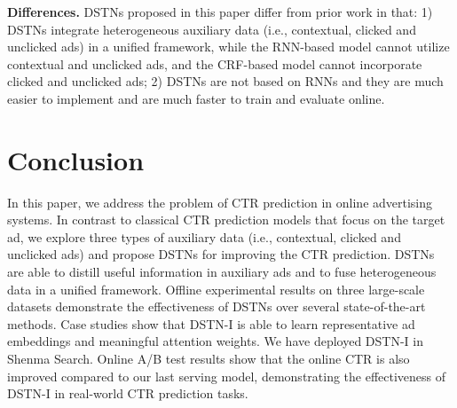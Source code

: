 \documentclass[sigconf]{acmart}
\begin{document}
\textbf{Differences.} DSTNs proposed in this paper differ from prior work in that: 1) DSTNs integrate heterogeneous auxiliary data (i.e., contextual, clicked and unclicked ads) in a unified framework, while the RNN-based model \cite{zhang2014sequential} cannot utilize contextual and unclicked ads, and the CRF-based model \cite{xiong2012relational} cannot incorporate clicked and unclicked ads; 2) DSTNs are not based on RNNs and they are much easier to implement and are much faster to train and evaluate online.

\section{Conclusion}
In this paper, we address the problem of CTR prediction in online advertising systems. In contrast to classical CTR prediction models that focus on the target ad, we explore three types of auxiliary data (i.e., contextual, clicked and unclicked ads) and propose DSTNs for improving the CTR prediction. DSTNs are able to distill useful information in auxiliary ads and to fuse heterogeneous data in a unified framework. Offline experimental results on three large-scale datasets demonstrate the effectiveness of DSTNs over several state-of-the-art methods. Case studies show that DSTN-I is able to learn representative ad embeddings and meaningful attention weights. We have deployed DSTN-I in Shenma Search. Online A/B test results show that the online CTR is also improved compared to our last serving model, demonstrating the effectiveness of DSTN-I in real-world CTR prediction tasks.



\end{document}
